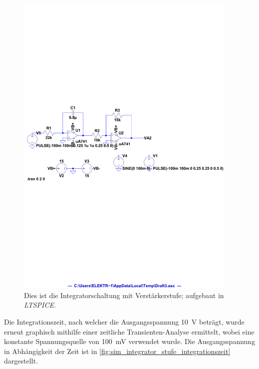 \documentclass[12pt,english,ngerman]{scrartcl}
\begin{document}
\begin{figure}[H]
  \centering
    \includegraphics[width=0.95\textwidth]{./figures/integrator/sim/mit_stufe/schaltung_spannungstypen.pdf}
  \caption{Dies ist die Integratorschaltung mit Verstärkerstufe; aufgebaut in \textit{LTSPICE}.}
  \label{fig:sim_integrator_stufe_schaltung}
\end{figure}

Die Integrationszeit, nach welcher die Ausgangsspannung \SI{10}{\volt} beträgt,
wurde erneut graphisch mithilfe einer zeitliche Transienten-Analyse ermittelt,
wobei eine konstante Spannungsquelle von \SI{100}{\milli\volt} verwendet wurde.
Die Ausgangsspannung in Abhängigkeit der Zeit ist in
\autoref{fig:sim_integrator_stufe_integrationszeit} dargestellt.
\end{document}
